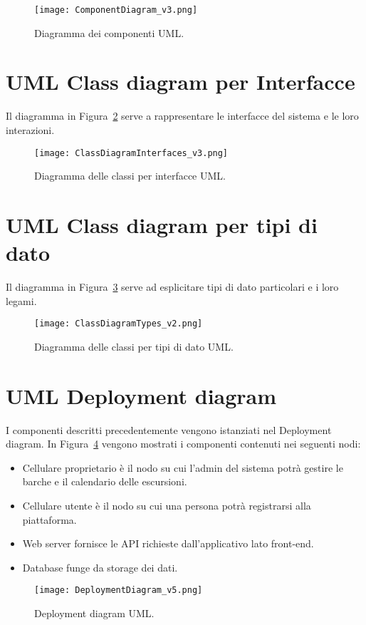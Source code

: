 \begin{figure}[!ht]
    \centering
    \texttt{[image: ComponentDiagram\_v3.png]}
    \caption{Diagramma dei componenti UML.}\label{fig:componentDiagram}
\end{figure}

\newpage

\section{UML Class diagram per Interfacce}
Il diagramma in Figura~\ref{fig:ClassDiagramInterfaces} serve a rappresentare le interfacce del sistema e le loro interazioni.
\begin{figure}[!ht]
    \centering
    \texttt{[image: ClassDiagramInterfaces\_v3.png]}
    \caption{Diagramma delle classi per interfacce UML.}\label{fig:ClassDiagramInterfaces}
\end{figure}

\newpage

\section{UML Class diagram per tipi di dato}
Il diagramma in Figura~\ref{fig:ClassDiagramTypes} serve ad esplicitare tipi di dato particolari e i loro legami.
\begin{figure}[!ht]
    \centering
    \texttt{[image: ClassDiagramTypes\_v2.png]}
    \caption{Diagramma delle classi per tipi di dato UML.}\label{fig:ClassDiagramTypes}
\end{figure}

\section{UML Deployment diagram}
I componenti descritti precedentemente vengono istanziati nel Deployment diagram. In Figura~\ref{fig:DeploymentDiagram} vengono mostrati i componenti contenuti nei seguenti nodi:

\begin{itemize}
    \item Cellulare proprietario è il nodo su cui l'admin del sistema potrà gestire le barche e il calendario delle escursioni.
    \item Cellulare utente è il nodo su cui una persona potrà registrarsi alla piattaforma.
    \item Web server fornisce le API richieste dall'applicativo lato front-end.
    \item Database funge da storage dei dati.
\end{itemize}

\begin{figure}[!ht]
    \centering
    \texttt{[image: DeploymentDiagram\_v5.png]}
    \caption{Deployment diagram UML.}\label{fig:DeploymentDiagram}
\end{figure}